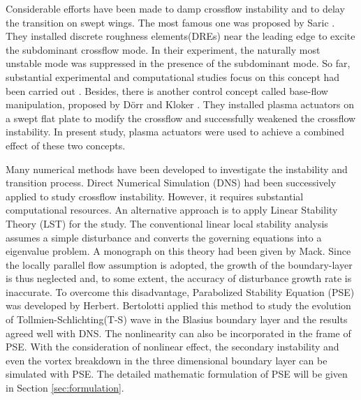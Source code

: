 \documentclass{AIAA}
\begin{document}
Considerable efforts have been made to damp crossflow instability and to delay the transition on swept wings. The most famous one was proposed by Saric \cite{Saric1998}. They installed discrete roughness elements(DREs) near the leading edge to excite the subdominant crossflow mode. In their experiment, the naturally most unstable mode was suppressed in the presence of the subdominant mode. So far, substantial experimental and computational studies focus on this concept had been carried out \cite{Malik1999,Haynes2000,Wassermann2002,Carpenter2008,LiFei2011,Hosseini2013,Li2015a}. Besides, there is another control concept called base-flow manipulation, proposed by D\"orr and Kloker \cite{dorr2015stabilisation}. They installed plasma actuators on a swept flat plate to modify the crossflow and successfully weakened the crossflow instability. In present study, plasma actuators were used to achieve a combined effect of these two concepts.

Many numerical methods have been developed to investigate the instability and transition process. Direct Numerical Simulation (DNS) had been successively applied to study crossflow instability\cite{Wassermann2005,Bonfigli2007,Duan2013,Hosseini2013}. However, it requires substantial computational resources. An alternative approach is to apply  Linear Stability Theory (LST) for the study. The conventional linear local stability analysis assumes a simple  disturbance and converts the governing equations into a eigenvalue problem. A monograph on this theory had been given by Mack\cite{Mack1984}. Since the locally parallel flow assumption is adopted, the growth of the boundary-layer  is thus neglected  and, to some extent, the  accuracy of disturbance growth rate is inaccurate. To overcome this disadvantage,  Parabolized Stability Equation (PSE) was developed by Herbert\cite{Herbert1987,Herbert1997,Herbert1993}. Bertolotti \cite{Bertolotti1991,Bertolotti1992} applied this method to study the evolution of Tollmien-Schlichting(T-S) wave in the Blasius boundary layer and the results agreed well with DNS. The nonlinearity can also be incorporated in the frame of PSE\cite{Hein2005}. With the consideration of nonlinear effect, the secondary instability and even the vortex breakdown in the three dimensional boundary layer can be simulated with PSE\cite{LiFei2011,Li2015a}. The detailed mathematic formulation of PSE will be given in Section \ref{sec:formulation}.
\end{document}
